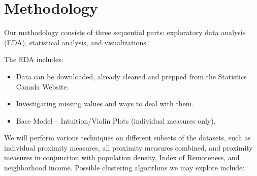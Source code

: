 \documentclass[11pt, a4paper]{article}
\newcommand{\comment}[1]{}
\begin{document}
\section*{Methodology}

\comment{
\subsection*{Data Investigation}
\subsection*{Statistical Analysis}
\subsection*{Visualization}
}

Our methodology consists of three sequential parts: exploratory data analysis (EDA), statistical analysis, and visualizations.
\par
The EDA includes:
\begin{itemize}
\item Data can be downloaded, already cleaned and prepped from the Statistics Canada Website. 
\item Investigating missing values and ways to deal with them. 
\item Base Model – Intuition/Violin Plots (individual measures only).
\end{itemize}

We will perform various techniques on different subsets of the datasets, such as individual proximity measures, all proximity measures combined, and proximity measures in conjunction with population density, Index of Remoteness, and neighborhood income. Possible clustering algorithms we may explore include:
\end{document}
